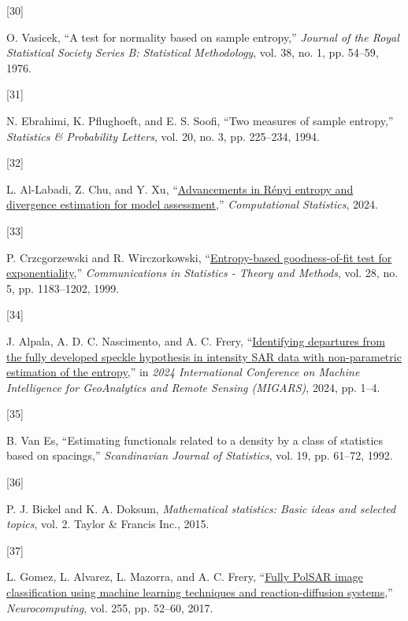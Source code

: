 \documentclass[
  lettersize  journal,
]{IEEEtran}%
\newlength{\cslhangindent}
\newlength{\csllabelwidth}
\newenvironment{CSLReferences}[2] %
 {\begin{list}{}{%
  \setlength{\itemindent}{0pt}
  \setlength{\leftmargin}{0pt}
  \setlength{\parsep}{0pt}
  \ifodd #1
   \setlength{\leftmargin}{\cslhangindent}
   \setlength{\itemindent}{-1\cslhangindent}
  \fi
  \setlength{\itemsep}{#2\baselineskip}}}
 {\end{list}}
\newcommand{\CSLLeftMargin}[1]{\parbox[t]{\csllabelwidth}{\strut#1\strut}}
\newcommand{\CSLRightInline}[1]{\parbox[t]{\linewidth - \csllabelwidth}{\strut#1\strut}}
\begin{document}
\begin{CSLReferences}{0}{0}
\CSLLeftMargin{{[}30{]} }%
\CSLRightInline{O. Vasicek, {``A test for normality based on sample
entropy,''} \emph{Journal of the Royal Statistical Society Series B:
Statistical Methodology}, vol. 38, no. 1, pp. 54--59, 1976. }

\CSLLeftMargin{{[}31{]} }%
\CSLRightInline{N. Ebrahimi, K. Pflughoeft, and E. S. Soofi, {``Two
measures of sample entropy,''} \emph{Statistics \& Probability Letters},
vol. 20, no. 3, pp. 225--234, 1994. }

\CSLLeftMargin{{[}32{]} }%
\CSLRightInline{L. Al-Labadi, Z. Chu, and Y. Xu,
{``\href{https://doi.org/10.1007/s00180-024-01507-z}{Advancements in
{R}ényi entropy and divergence estimation for model assessment},''}
\emph{Computational Statistics}, 2024. }

\CSLLeftMargin{{[}33{]} }%
\CSLRightInline{P. Crzcgorzewski and R. Wirczorkowski,
{``\href{https://doi.org/10.1080/03610929908832351}{Entropy-based
goodness-of-fit test for exponentiality},''} \emph{Communications in
Statistics - Theory and Methods}, vol. 28, no. 5, pp. 1183--1202, 1999.
}

\CSLLeftMargin{{[}34{]} }%
\CSLRightInline{J. Alpala, A. D. C. Nascimento, and A. C. Frery,
{``\href{https://doi.org/10.1109/migars61408.2024.10544448}{Identifying
departures from the fully developed speckle hypothesis in intensity
{SAR} data with non-parametric estimation of the entropy},''} in
\emph{2024 {I}nternational {C}onference on {M}achine {I}ntelligence for
{G}eo{A}nalytics and {R}emote {S}ensing ({MIGARS})}, 2024, pp. 1--4. }

\CSLLeftMargin{{[}35{]} }%
\CSLRightInline{B. Van Es, {``Estimating functionals related to a
density by a class of statistics based on spacings,''}
\emph{Scandinavian Journal of Statistics}, vol. 19, pp. 61--72, 1992. }

\CSLLeftMargin{{[}36{]} }%
\CSLRightInline{P. J. Bickel and K. A. Doksum, \emph{Mathematical
statistics: Basic ideas and selected topics}, vol. 2. Taylor \& Francis
Inc., 2015. }

\CSLLeftMargin{{[}37{]} }%
\CSLRightInline{L. Gomez, L. Alvarez, L. Mazorra, and A. C. Frery,
{``\href{https://doi.org/10.1016/j.neucom.2016.08.140}{Fully PolSAR
image classification using machine learning techniques and
reaction-diffusion systems},''} \emph{Neurocomputing}, vol. 255, pp.
52--60, 2017. }


\end{CSLReferences}
\end{document}

